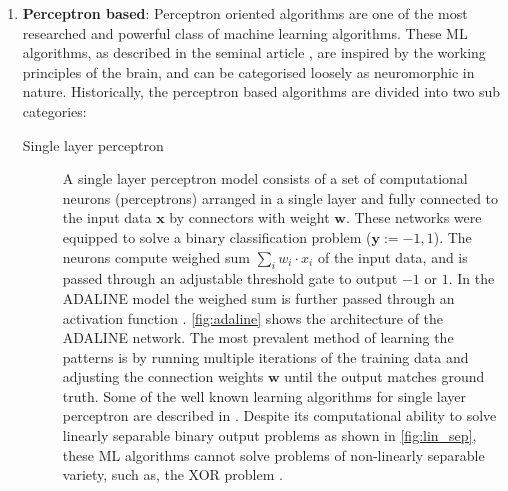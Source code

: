 \begin{enumerate}
		 
	\item \textbf{Perceptron based}: Perceptron oriented algorithms are one of the most researched and powerful class of machine learning algorithms. These ML algorithms, as described in the seminal article \citep{rosenblatt1958perceptron}, are inspired by the working principles of the brain, and can be categorised loosely as neuromorphic in nature. Historically, the perceptron based algorithms are divided into two sub categories:
		\begin{description}
			\item[Single layer perceptron] A single layer perceptron model consists of a set of computational neurons (perceptrons) arranged in a single layer and fully connected to the input data $\mathbf{x}$ by connectors with weight $\mathbf{w}$. These networks were equipped to solve a binary classification problem ($\mathbf{y}:={-1, 1}$). The neurons compute weighed sum $\displaystyle \sum_i w_i\cdot x_i$ of the input data, and is passed through an adjustable threshold gate to output $-1$ or $1$. In the ADALINE model the weighed sum is further passed through an activation function \citep{widrow199030}. \figurename \ref{fig:adaline} shows the architecture of the ADALINE network. The most prevalent method of learning the patterns is by running multiple iterations of the training data and adjusting the connection weights $\mathbf{w}$ until the output matches ground truth. Some of the well known learning algorithms for single layer perceptron are described in \citep{littlestone1994weighted, freund1999large}. Despite its computational ability to solve linearly separable binary output problems as shown in \figurename \ref{fig:lin_sep}, these ML algorithms cannot solve problems of non-linearly separable variety, such as, the XOR problem \citep{minsky1969perceptrons}. 
			

\end{description}
\end{enumerate}
